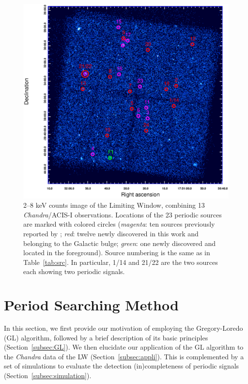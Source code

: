 \documentclass[fleqn,usenatbib]{mnras}
\begin{document}
\begin{figure}
\centering
\includegraphics[scale=0.8]{./figure/LW/ds9.eps}
\caption{2--8 keV counts image of the Limiting Window, combining 13 {\it Chandra}/ACIS-I observations. Locations of the 23 periodic sources are marked with colored circles ({\it magenta}: ten sources previously reported by \citep{2012ApJ...746..165H}; {\it red}: twelve newly discovered in this work and belonging to the Galactic bulge; {\it green}: one newly discovered and located in the foreground). Source numbering is the same as in Table~\ref{tab:src}. In particular, 1/14 and 21/22 are the two sources each showing two periodic signals.}
\label{fig:FoV}
\end{figure}

\section{Period Searching Method}\label{sec:methods}
In this section, we first provide our motivation of employing the Gregory-Loredo (GL) algorithm, followed by a brief description of its basic principles (Section~\ref{subsec:GL}). We then elucidate our application of the GL algorithm to the {\it Chandra} data of the LW (Section~\ref{subsec:appli}). This is complemented by a set of simulations to evaluate the detection (in)completeness of periodic signals (Section~\ref{subsec:simulation}).  
\end{document}
